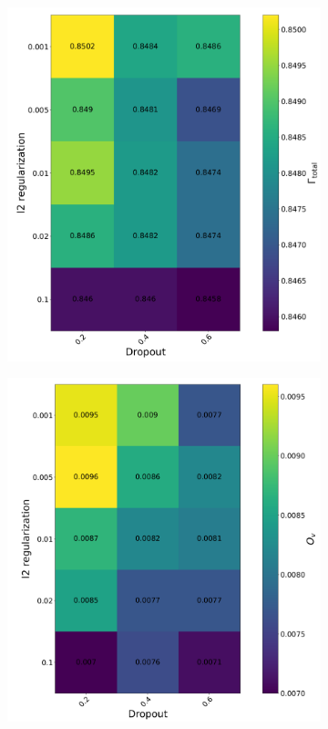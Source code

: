 \begin{figure}[H]
\begin{subfigure}{.5\textwidth}
  \centering
  \includegraphics[width=.99\linewidth]{figs/FNN/Heat_l2DropAuc}
  \caption{}
  \label{fig:ReguLr}
\end{subfigure}%
\begin{subfigure}{.5\textwidth}
  \centering
  \includegraphics[width=.99\linewidth]{figs/FNN/Heat_l2DropOv}

\end{subfigure}
\end{figure}
